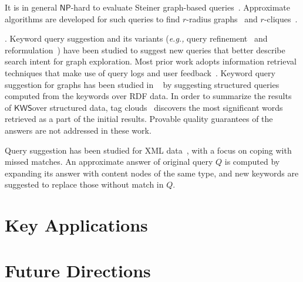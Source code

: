 \documentclass[graybox, natbib, nosecnum, twocolumn]{svmult}
\newcommand{\stitle}[1]{\vspace{1.6ex}\noindent{\bf #1}}
\newcommand{\NP}{\kw{NP}}
\newcommand{\kw}[1]{{\ensuremath {\mathsf{#1}}}}
\newcommand{\kws}{\kw{KWS}}
\newcommand{\eg}{\emph{e.g.,}\xspace}
\begin{document}
It is in general \NP-hard 
to evaluate Steiner graph-based queries~\citep{yu2010keyword, kargar2011keyword}. 
Approximate algorithms are developed for such queries to 
find $r$-radius graphs~\citep{li2008ease}
and $r$-cliques~\citep{kargar2011keyword}. 

\stitle{Keyword query suggestion}. 
Keyword query suggestion and its variants 
(\eg query refinement~\cite{mishra2009interactive} and reformulation~\citep{yao2012keyword}) 
have been studied to suggest new queries that better describe search intent 
for graph exploration. 
Most prior work adopts information retrieval techniques that make use of 
query logs and user feedback~\citep{carpineto2012survey,cao2008context}.
Keyword query suggestion for graphs has been studied in ~\citep{tran2009top} by suggesting structured queries computed from the keywords over RDF data. In order to summarize the results of \kws over structured data, tag clouds~\citep{koutrika2009data} discovers the most significant words retrieved as a part of the initial results. 
Provable quality guarantees of the answers are not addressed in these work. 

Query suggestion has been studied 
for XML data~\citep{zeng2014breaking}, 
with a focus on coping with missed matches. An approximate 
answer of original query $Q$ is computed by expanding 
its answer with content nodes of the same type, and 
new keywords are suggested to replace those 
without match in $Q$. 


 



\section{Key Applications}

\section{Future Directions} 



\end{document}
